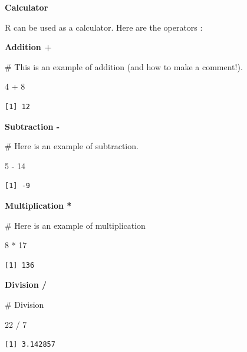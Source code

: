 \documentclass[
  letterpaper,
  DIV=11,
  numbers=noendperiod]{scrreprt}
\newenvironment{Shaded}{\begin{snugshade}}{\end{snugshade}}
\newcommand{\CommentTok}[1]{\textcolor[rgb]{0.37,0.37,0.37}{#1}}
\newcommand{\DecValTok}[1]{\textcolor[rgb]{0.68,0.00,0.00}{#1}}
\newcommand{\SpecialCharTok}[1]{\textcolor[rgb]{0.37,0.37,0.37}{#1}}
\begin{document}
\textbf{Calculator}

R can be used as a calculator. Here are the operators :

\textbf{Addition +}

\begin{Shaded}
\begin{Highlighting}[]
\CommentTok{\# This is an example of addition (and how to make a comment!).}

\DecValTok{4} \SpecialCharTok{+} \DecValTok{8}
\end{Highlighting}
\end{Shaded}

\begin{verbatim}
[1] 12
\end{verbatim}

\textbf{Subtraction -}

\begin{Shaded}
\begin{Highlighting}[]
\CommentTok{\# Here is an example of subtraction.}

\DecValTok{5} \SpecialCharTok{{-}} \DecValTok{14}
\end{Highlighting}
\end{Shaded}

\begin{verbatim}
[1] -9
\end{verbatim}

\textbf{Multiplication *}

\begin{Shaded}
\begin{Highlighting}[]
\CommentTok{\# Here is an example of multiplication}

\DecValTok{8} \SpecialCharTok{*} \DecValTok{17}
\end{Highlighting}
\end{Shaded}

\begin{verbatim}
[1] 136
\end{verbatim}

\textbf{Division /}

\begin{Shaded}
\begin{Highlighting}[]
\CommentTok{\# Division}

\DecValTok{22} \SpecialCharTok{/} \DecValTok{7}
\end{Highlighting}
\end{Shaded}

\begin{verbatim}
[1] 3.142857
\end{verbatim}
\end{document}
